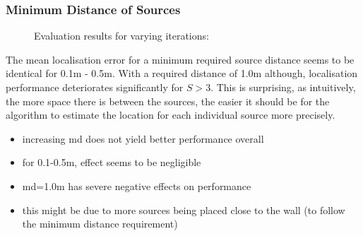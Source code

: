 \subsubsection{Minimum Distance of Sources}

\begin{figure}[H]
	\begin{tikzpicture}
	    
	    
	\end{tikzpicture}
	\caption[Evaluation results for varying  iterations]{Evaluation results for varying  iterations: }
	\label{fig:trial1}
\end{figure}

The mean localisation error for a minimum required source distance seems to be identical for 0.1m - 0.5m. With a required distance of 1.0m although, localisation performance deteriorates significantly for $S>3$. This is surprising, as intuitively, the more space there is between the sources, the easier it should be for the algorithm to estimate the location for each individual source more precisely. 

\begin{itemize}
    \item increasing md does not yield better performance overall
    \item for 0.1-0.5m, effect seems to be negligible
    \item md=1.0m has severe negative effects on performance
    \item this might be due to more sources being placed close to the wall (to follow the minimum distance requirement)
\end{itemize}